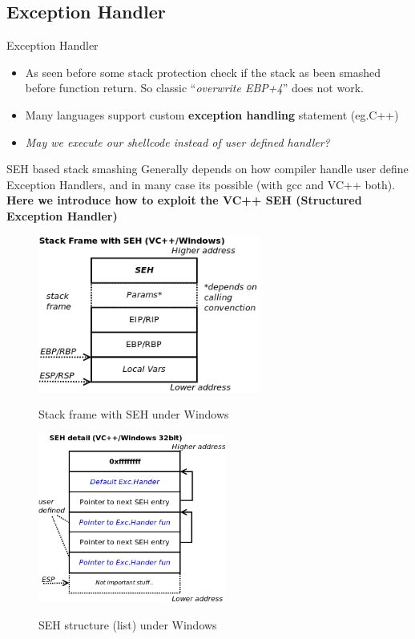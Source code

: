 \subsection{Exception Handler}
\begin{frame}{Exception Handler}

\begin{itemize}
\item As seen before some stack protection check if the stack as been smashed before function return. So classic ``\emph{overwrite EBP+4}'' does not work.
\item Many languages support custom {\bf exception handling} statement (eg.C++)
\item \emph{May we execute our shellcode instead of user defined handler?}
\end{itemize}

\begin{block}{SEH based stack smashing}
Generally depends on how compiler handle user define Exception Handlers, and in many case its possible (with gcc and VC++ both).\\
{\bf Here we introduce how to exploit the VC++ SEH (Structured Exception Handler)}
\end{block}

\framebreak
	\begin{figure}
        \includegraphics[width=0.65\textwidth]{imgs/seh-stack-frame.png}
        \label{fig:seh-stack-frame}
        \caption{Stack frame with SEH under Windows}
    \end{figure}	
\framebreak
	\begin{figure}
        \includegraphics[width=0.55\textwidth]{imgs/seh-detail.png}
        \label{fig:seh-detail}
        \caption{SEH structure (list) under Windows}
    \end{figure}
   

\end{frame}
